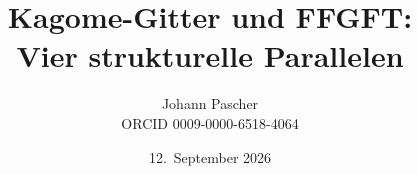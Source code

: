 \documentclass[11pt,a4paper]{report}
\title{Kagome-Gitter und FFGFT:\\[0.5em]
  \large Vier strukturelle Parallelen}
\date{12.~September 2026}
\author{Johann Pascher\\\small ORCID 0009-0000-6518-4064}
\begin{document}
\renewcommand{\thechapter}{}
\renewcommand{\thesection}{\arabic{section}}
\maketitle
\tableofcontents

\end{document}
